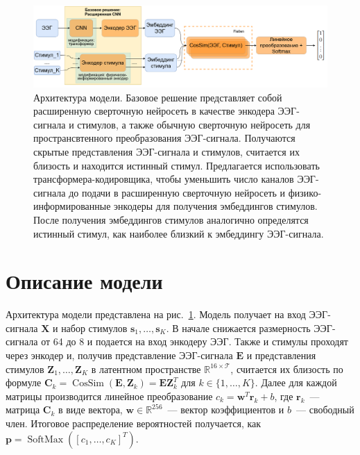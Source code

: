 \documentclass{article}
\begin{document}
    \begin{figure}[t]
        \centering
        \includegraphics[scale=0.3]{model_architecture.png}
        \caption{Архитектура модели. Базовое решение представляет собой расширенную сверточную нейросеть в качестве энкодера ЭЭГ-сигнала и стимулов, а также обычную сверточную нейросеть для пространсвтенного преобразования ЭЭГ-сигнала. Получаются скрытые представления ЭЭГ-сигнала и стимулов, считается их близость и находится истинный стимул. Предлагается использовать трансформера-кодировщика, чтобы уменьшить число каналов ЭЭГ-сигнала до подачи в расширенную сверточную нейросеть и физико-информированные энкодеры для получения эмбеддингов стимулов. После получения эмбеддингов стимулов аналогично определятся истинный стимул, как наиболее близкий к эмбеддингу ЭЭГ-сигнала.}
        \label{model}
    \end{figure}

\section{Описание модели}
    Архитектура модели представлена на рис.~\ref{model}. Модель получает на вход ЭЭГ-сигнала $\mathbf{X}$ и набор стимулов $\mathbf{s}_1, \dots, \mathbf{s}_K$. В начале снижается размерность ЭЭГ-сигнала от 64 до 8 и подается на вход энкодеру ЭЭГ. Также и стимулы проходят через энкодер и, получив представление ЭЭГ-сигнала $\mathbf{E}$ и представления стимулов $\mathbf{Z}_1, \dots, \mathbf{Z}_K$ в латентном пространстве $\mathbb{R}^{16 \times \mathcal{T}}$, считается их близость по формуле $\mathbf{C}_k = \operatorname{CosSim}(\mathbf{E}, \mathbf{Z}_k) = \mathbf{E} \mathbf{Z}_k^T$ для $k \in \{1, \dots, K\}$. Далее для каждой матрицы производится линейное преобразование $c_k = \mathbf{w}^T \mathbf{r}_k + b$, где $\mathbf{r}_k$~--- матрица $\mathbf{C}_k$ в виде вектора, $\mathbf{w} \in \mathbb{R}^{256}$~--- вектор коэффициентов и $b$~--- свободный член. Итоговое распределение вероятностей получается, как $\mathbf{p} = \operatorname{SoftMax}\left( \left[c_1, \dots, c_K \right]^T \right)$.
\end{document}

